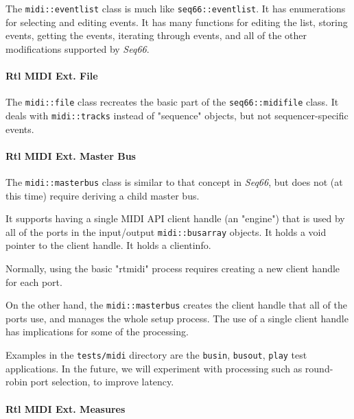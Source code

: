    The \texttt{midi::eventlist} class is much like \texttt{seq66::eventlist}.
   It has enumerations for selecting and editing events.
   It has many functions for editing the list, storing events,
   getting the events, iterating through events, and all of the other modifications
   supported by \textsl{Seq66}.

\paragraph{Rtl MIDI Ext. File}
\label{paragraph:rtl_midi_extensions_file}

   The \texttt{midi::file} class recreates the basic part of
   the \texttt{seq66::midifile} class.
   It deals with \texttt{midi::tracks} instead of "sequence" objects,
   but not sequencer-specific events.

\paragraph{Rtl MIDI Ext. Master Bus}
\label{paragraph:rtl_midi_extensions_master_bus}

   The \texttt{midi::masterbus} class is similar to that concept in
   \textsl{Seq66}, but does not (at this time)
   require deriving a child master bus.

   It supports having a single MIDI API client handle (an "engine")
   that is used by all of the ports in the input/output
   \texttt{midi::busarray} objects.
   It holds a void pointer to the client handle.
   It holds a clientinfo.

   Normally, using the basic "rtmidi" process requires creating
   a new client handle for each port.

   On the other hand, the \texttt{midi::masterbus} creates the
   client handle that all of the ports use, and manages the whole
   setup process. The use of a single client handle has implications
   for some of the processing.

   Examples in the \texttt{tests/midi} directory are the
   \texttt{busin},
   \texttt{busout},
   \texttt{play}
   test applications.
   In the future, we will experiment with processing such as round-robin port
   selection, to improve latency.

\paragraph{Rtl MIDI Ext. Measures}
\label{paragraph:rtl_midi_extensions_measures}

